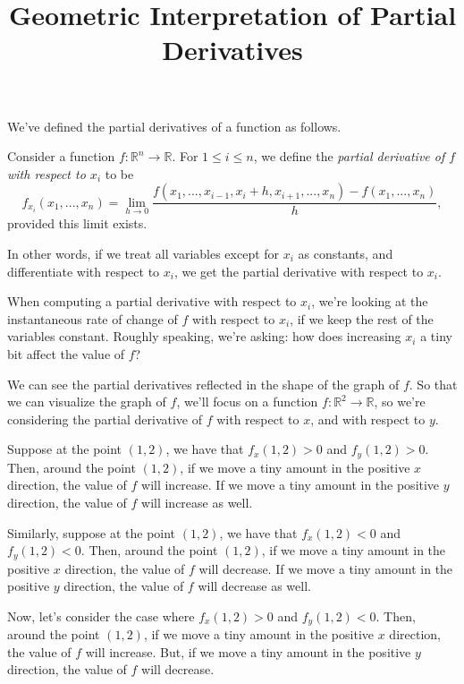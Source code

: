 \documentclass{ximera}
\title{Geometric Interpretation of Partial Derivatives}
\begin{document}
\begin{abstract}
\end{abstract}
\maketitle

We've defined the partial derivatives of a function as follows.

\begin{definition}
Consider a function $f:\mathbb{R}^n\rightarrow\mathbb{R}$. For $1\leq i\leq n$, we define the \emph{partial derivative of $f$ with respect to $x_i$} to be
\[
f_{x_i}(x_1,...,x_n) = \lim_{h\rightarrow 0}\frac{f(x_1,...,x_{i-1}, x_i+h, x_{i+1},...,x_n)-f(x_1,...,x_n)}{h},
\]
provided this limit exists.
\end{definition}

In other words, if we treat all variables except for $x_i$ as constants, and differentiate with respect to $x_i$, we get the partial derivative with respect to $x_i$. 

When computing a partial derivative with respect to $x_i$, we're looking at the instantaneous rate of change of $f$ with respect to $x_i$, if we keep the rest of the variables constant. Roughly speaking, we're asking: how does increasing $x_i$ a tiny bit affect the value of $f$?

We can see the partial derivatives reflected in the shape of the graph of $f$. So that we can visualize the graph of $f$, we'll focus on a function $f:\mathbb{R}^2\rightarrow\mathbb{R}$, so we're considering the partial derivative of $f$ with respect to $x$, and with respect to $y$.

Suppose at the point $(1,2)$, we have that $f_x(1,2)>0$ and $f_y(1,2)>0$. Then, around the point $(1,2)$, if we move a tiny amount in the positive $x$ direction, the value of $f$ will increase. If we move a tiny amount in the positive $y$ direction, the value of $f$ will increase as well.


Similarly, suppose at the point $(1,2)$, we have that $f_x(1,2)<0$ and $f_y(1,2)<0$. Then, around the point $(1,2)$, if we move a tiny amount in the positive $x$ direction, the value of $f$ will decrease. If we move a tiny amount in the positive $y$ direction, the value of $f$ will decrease as well.


Now, let's consider the case where $f_x(1,2)>0$ and $f_y(1,2)<0$. Then, around the point $(1,2)$, if we move a tiny amount in the positive $x$ direction, the value of $f$ will increase. But, if we move a tiny amount in the positive $y$ direction, the value of $f$ will decrease.
\end{document}
